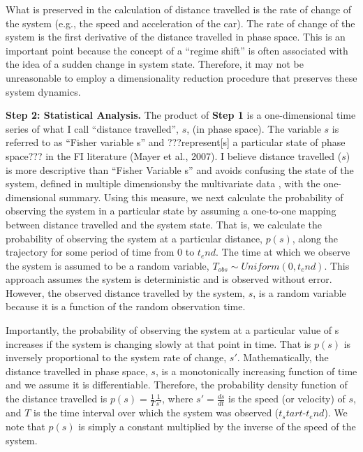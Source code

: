 \documentclass[12pt,twoside,openany]{reedthesis}
\begin{document}
What is preserved in the calculation of distance travelled is the rate of change of the system (e.g., the speed and acceleration of the car). The rate of change of the system is the first derivative of the distance travelled in phase space. This is an important point because the concept of a ``regime shift'' is often associated with the idea of a sudden change in system state. Therefore, it may not be unreasonable to employ a dimensionality reduction procedure that preserves these system dynamics.

\textbf{Step 2: Statistical Analysis.} The product of \textbf{Step 1} is a one-dimensional time series of what I call ``distance travelled'', \(s\), (in phase space). The variable \(s\) is referred to as ``Fisher variable s'' and ???represent{[}s{]} a particular state of phase space??? in the FI literature (Mayer et al., 2007). I believe distance travelled (\(s\)) is more descriptive than ``Fisher Variable s'' and avoids confusing the state of the system, defined in multiple dimensionsby the multivariate data , with the one-dimensional summary. Using this measure, we next calculate the probability of observing the system in a particular state by assuming a one-to-one mapping between distance travelled and the system state. That is, we calculate the probability of observing the system at a particular distance, \(p(s)\), along the trajectory for some period of time from 0 to \(t_end\). The time at which we observe the system is assumed to be a random variable, \(T_{obs} \sim Uniform(0,t_end)\). This approach assumes the system is deterministic and is observed without error. However, the observed distance travelled by the system, \(s\), is a random variable because it is a function of the random observation time.

Importantly, the probability of observing the system at a particular value of s increases if the system is changing slowly at that point in time. That is \(p(s)\) is inversely proportional to the system rate of change, \(s'\). Mathematically, the distance travelled in phase space, \(s\), is a monotonically increasing function of time and we assume it is differentiable. Therefore, the probability density function of the distance travelled is \(p(s)=\frac{1}{T}\frac{1}{s'}\), where \(s'=\frac{ds}{dt}\) is the speed (or velocity) of \(s\), and \(T\) is the time interval over which the system was observed (\(t_start\)-\(t_end\)). We note that \(p(s)\) is simply a constant multiplied by the inverse of the speed of the system.
\end{document}

